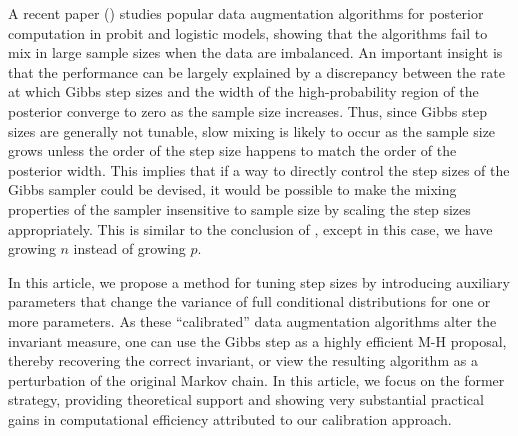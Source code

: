 \documentclass[10pt]{article}
\begin{document}
A recent paper (\cite{johndrow2016inefficiency}) studies popular data augmentation algorithms for posterior computation in probit \citep{albert1993bayesian} and logistic  \citep{polson2013bayesian} models, showing that the algorithms fail to mix in large sample sizes when the data are imbalanced. An important insight is that the performance can be largely explained by a discrepancy between the rate at which Gibbs step sizes and the width of the high-probability region of the posterior converge to zero as the sample size increases. Thus, since Gibbs step sizes are generally not tunable, slow mixing is likely to occur as the sample size grows unless the order of the step size happens to match the order of the posterior width. This implies that if a way to directly control the step sizes of the Gibbs sampler could be devised, it would be possible to make the mixing properties of the sampler insensitive to sample size by scaling the step sizes appropriately. This is similar to the conclusion of \cite{hairer2014spectral}, except in this case, we have growing $n$ instead of growing $p$.

In this article, we propose a method for tuning step sizes by introducing auxiliary parameters that change the variance of full conditional distributions for one or more parameters. As these ``calibrated'' data augmentation algorithms alter the invariant measure, one can use the Gibbs step as a highly efficient M-H proposal, thereby recovering the correct invariant, or view the resulting algorithm as a perturbation of the original Markov chain.  In this article, we focus on the former strategy, providing theoretical support and showing very substantial practical gains in computational efficiency attributed to our calibration approach.
\end{document}
